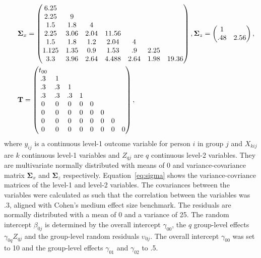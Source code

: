 \documentclass[10pt, a4paper, titlepage]{article}
\begin{document}
\begin{subequations}
\begin{align}
        &\hspace{.5cm}\boldsymbol{\Sigma}_{x} = \begin{pmatrix}
            6.25& & & & & & \\
            2.25& 9& & & & & \\
            1.5& 1.8& 4& & & & \\
            2.25& 3.06& 2.04& 11.56& & & \\
            1.5& 1.8& 1.2& 2.04& 4& & \\
            1.125& 1.35& 0.9& 1.53& .9& 2.25& \\
            3.3& 3.96& 2.64& 4.488& 2.64& 1.98& 19.36
        \end{pmatrix}, \boldsymbol{\Sigma}_{z} = \begin{pmatrix}
            1& \\
            .48& 2.56
        \end{pmatrix}, \label{eq:sigma} \\ 
        &\hspace{.5cm}\mathbf{T} = \begin{pmatrix}
            t_{00}& & & & & & \\
              .3& 1& & & & & \\
              .3& .3& 1& & & & \\
              .3& .3& .3& 1& & & \\
              0& 0& 0& 0& 0& & \\
              0& 0& 0& 0& 0& 0& \\
              0& 0& 0& 0& 0& 0& 0 \\
              0& 0& 0& 0& 0& 0& 0& 0
        \end{pmatrix} \label{eq:T},
\end{align}
\end{subequations} where $y_{ij}$ is a continuous level-1 outcome variable for person $i$ in group $j$ and $X_{kij}$ are $k$ continuous level-1 variables and $Z_{qj}$ are $q$ continuous level-2 variables. They are multivariate normally distributed with means of 0 and variance-covariance matrix $\boldsymbol{\Sigma}_{x}$ and $\boldsymbol{\Sigma}_{z}$ respectively. Equation~\ref{eq:sigma} shows the variance-covriance matrices of the level-1 and level-2 variables. The covariances between the variables were calculated as such that the correlation between the variables was .3, aligned with Cohen's \citeyearpar{cohen1990} medium effect size benchmark. The residuals are normally distributed with a mean of 0 and a variance of 25. The random intercept $\beta_{0j}$ is determined by the overall intercept $\gamma_{00}$, the $q$ group-level effects $\gamma_{0q}Z_{qj}$ and the group-level random residuals $\upsilon_{0j}$. The overall intercept $\gamma_{00}$ was set to 10 and the group-level effects $\gamma_{01}$ and $\gamma_{02}$ to .5.
\end{document}
